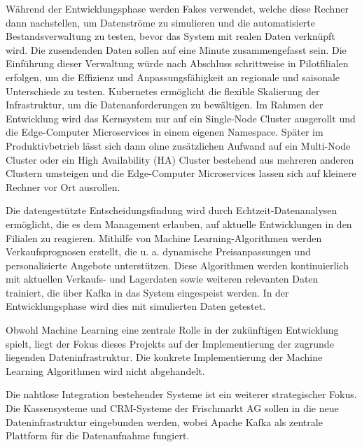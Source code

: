 \documentclass[%
pdftex,
oneside,			%
11pt,				%
parskip=half,		%
headheight = 12pt,	%
headsepline,		%
footsepline,		%
footheight = 16pt,	%
abstracton,		%
DIV=calc,		%
BCOR=8mm,		%
headinclude=false,	%
footinclude=false,	%
listof=totoc,		%
toc=bibliography,	%
]{scrreprt}	%
\begin{document}
    Während der Entwicklungsphase werden Fakes verwendet, welche diese Rechner dann nachstellen, um Datenströme zu simulieren und die automatisierte Bestandsverwaltung zu testen, bevor das System mit realen Daten verknüpft wird.
    Die zusendenden Daten sollen auf eine Minute zusammengefasst sein.
    Die Einführung dieser Verwaltung würde nach Abschluss schrittweise in Pilotfilialen erfolgen, um die Effizienz und Anpassungsfähigkeit an regionale und saisonale Unterschiede zu testen.
    Kubernetes ermöglicht die flexible Skalierung der Infrastruktur, um die Datenanforderungen zu bewältigen.
    Im Rahmen der Entwicklung wird das Kernsystem nur auf ein Single-Node Cluster ausgerollt und die Edge-Computer Microservices in einem eigenen Namespace.
    Später im Produktivbetrieb lässt sich dann ohne zusätzlichen Aufwand auf ein Multi-Node Cluster oder ein High Availability (HA) Cluster bestehend aus mehreren anderen Clustern umsteigen und die Edge-Computer Microservices lassen sich auf kleinere Rechner vor Ort ausrollen.


    Die datengestützte Entscheidungsfindung wird durch Echtzeit-Datenanalysen ermöglicht, die es dem Management erlauben, auf aktuelle Entwicklungen in den Filialen zu reagieren.
    Mithilfe von Machine Learning-Algorithmen werden Verkaufsprognosen erstellt, die u. a. dynamische Preisanpassungen und personalisierte Angebote unterstützen.
    Diese Algorithmen werden kontinuierlich mit aktuellen Verkaufs- und Lagerdaten sowie weiteren relevanten Daten trainiert, die über Kafka in das System eingespeist werden.
    In der Entwicklungsphase wird dies mit simulierten Daten getestet.

    Obwohl Machine Learning eine zentrale Rolle in der zukünftigen Entwicklung spielt, liegt der Fokus dieses Projekts auf der Implementierung der zugrunde liegenden Dateninfrastruktur.
    Die konkrete Implementierung der Machine Learning Algorithmen wird nicht abgehandelt.


    Die nahtlose Integration bestehender Systeme ist ein weiterer strategischer Fokus.
    Die Kassensysteme und CRM-Systeme der Frischmarkt AG sollen in die neue Dateninfrastruktur eingebunden werden, wobei Apache Kafka als zentrale Plattform für die Datenaufnahme fungiert.
\end{document}
